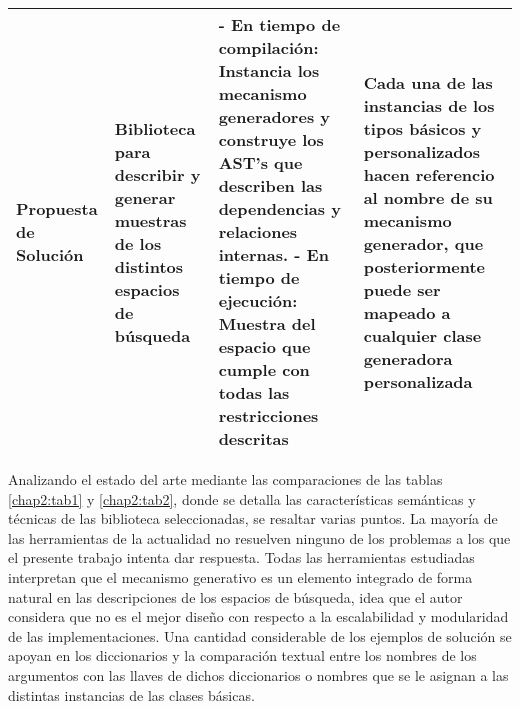 \begin{longtable}{  p{2.5cm}  p{4cm}  p{6.8cm}  p{6.5cm} }
    \hline
    \rowcolor{lavender}
    Propuesta de Solución                                                                                                                                                                                                                                                                                                                                         &
    Biblioteca para describir y generar muestras de los distintos espacios de búsqueda                                                                                                                                                                                                                                                                            &
    - En tiempo de compilación: Instancia los mecanismo generadores y construye los AST's que describen las dependencias y relaciones internas. \newline- En tiempo de ejecución: Muestra del espacio que cumple con todas las restricciones descritas                                                                                                            &
    Cada una de las instancias de los tipos básicos y personalizados hacen referencio al nombre de su mecanismo generador, que posteriormente puede ser mapeado a cualquier clase generadora personalizada                                                                                                                                                          \\
    \hline
\end{longtable}


\newpage


Analizando el estado del arte mediante las comparaciones de las tablas \ref{chap2:tab1} y \ref{chap2:tab2},
donde se detalla las características semánticas y técnicas de las biblioteca
seleccionadas, se resaltar varias puntos. La mayoría de las herramientas de la
actualidad no resuelven ninguno de los problemas a los que el presente trabajo
intenta dar respuesta. Todas las herramientas estudiadas interpretan que el
mecanismo generativo es un elemento integrado de forma natural en las descripciones
de los espacios de búsqueda, idea que el autor considera que no es el mejor
diseño con respecto a la escalabilidad y modularidad de las implementaciones.
Una cantidad considerable de los ejemplos de solución se apoyan en los diccionarios
y la comparación textual entre los nombres de los argumentos con las llaves
de dichos diccionarios o nombres que se le asignan a las distintas instancias de
las clases básicas.

